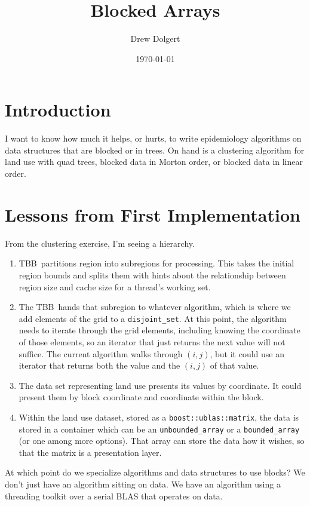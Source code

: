 \documentclass{article}
\newcommand{\TBB}{\textsc{TBB}}
\begin{document}
\title{Blocked Arrays}
\author{Drew Dolgert}
\date{\today}
\maketitle

\section{Introduction}
I want to know how much it helps, or hurts, to write epidemiology algorithms on data structures that are blocked or in trees. On hand is a clustering algorithm for land use with quad trees, blocked data in Morton order, or blocked data in linear order.

\section{Lessons from First Implementation}
From the clustering exercise, I'm seeing a hierarchy.

\begin{enumerate}
\item \TBB\ partitions region into subregions for processing. This takes the initial region bounds and splits them with hints about the relationship between region size and cache size for a thread's working set.
\item The \TBB\ hands that subregion to whatever algorithm, which is where we add elements of the grid to a \texttt{disjoint\_set}. At this point, the algorithm needs to iterate through the grid elements, including knowing the coordinate of those elements, so an iterator that just returns the next value will not suffice. The current algorithm walks through $(i,j)$, but it could use an iterator that returns both the value and the $(i,j)$ of that value.
\item The data set representing land use presents its values by coordinate. It could present them by block coordinate and coordinate within the block.
\item Within the land use dataset, stored as a \texttt{boost::ublas::matrix}, the data is stored in a container which can be an \texttt{unbounded\_array} or a \texttt{bounded\_array} (or one among more options). That array can store the data how it wishes, so that the matrix is a presentation layer.
\end{enumerate}

At which point do we specialize algorithms and data structures to use blocks? We don't just have an algorithm sitting on data. We have an algorithm using a threading toolkit over a serial BLAS that operates on data.
\end{document}

